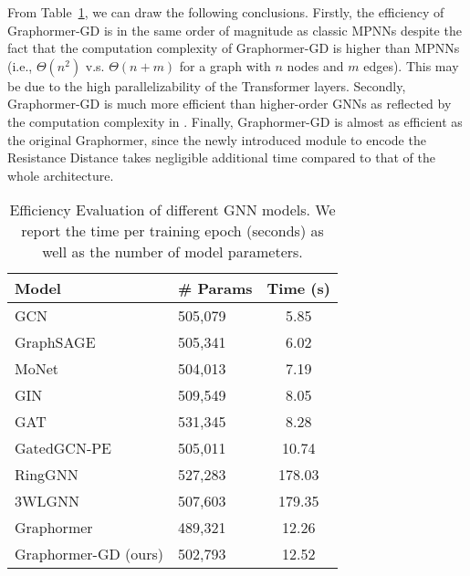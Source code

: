 \documentclass{article} %
\let\cref\crtcref
\begin{document}
From Table~\ref{tab:efficiency-evaluation}, we can draw the following conclusions. Firstly, the efficiency of Graphormer-GD is in the same order of magnitude as classic MPNNs despite the fact that the computation complexity of Graphormer-GD is higher than MPNNs (i.e., $\Theta(n^2)$ v.s. $\Theta(n+m)$ for a graph with $n$ nodes and $m$ edges). This may be due to the high parallelizability of the Transformer layers. Secondly, Graphormer-GD is much more efficient than higher-order GNNs as reflected by the computation complexity in \cref{tab:summary_of_results}. Finally, Graphormer-GD is almost as efficient as the original Graphormer, since the newly introduced module to encode the Resistance Distance takes negligible additional time compared to that of the whole architecture.

\begin{table}[h]
    \vspace{-5pt}
    \small
    \centering
    \caption{Efficiency Evaluation of different GNN models. We report the time per training epoch (seconds) as well as the number of model parameters.}
    \label{tab:efficiency-evaluation}
    \vspace{2pt}
    \begin{tabular}{llc}
    \toprule
    Model & \# Params & Time (s)\\
    \midrule
    GCN~\citep{kipf2017semisupervised} & 505,079 & 5.85 \\
    GraphSAGE~\citep{hamilton2017inductive} & 505,341 & 6.02 \\
        MoNet~\citep{monti2017geometric} & 504,013 & 7.19 \\
    GIN~\citep{xu2019powerful} & 509,549 & 8.05 \\
    GAT~\citep{velivckovic2018graph} & 531,345 & 8.28 \\
        GatedGCN-PE~\citep{bresson2017residual} & 505,011 & 10.74 \\
        RingGNN~\citep{chen2019equivalence} & 527,283 & 178.03  \\
        3WLGNN~\citep{maron2019provably} & 507,603 & 179.35 \\
        Graphormer~\citep{ying2021transformers} & 489,321 & 12.26 \\
        \midrule
    Graphormer-GD (ours) & 502,793 & 12.52\\
    \bottomrule
    \end{tabular}
\end{table}
\end{document}
